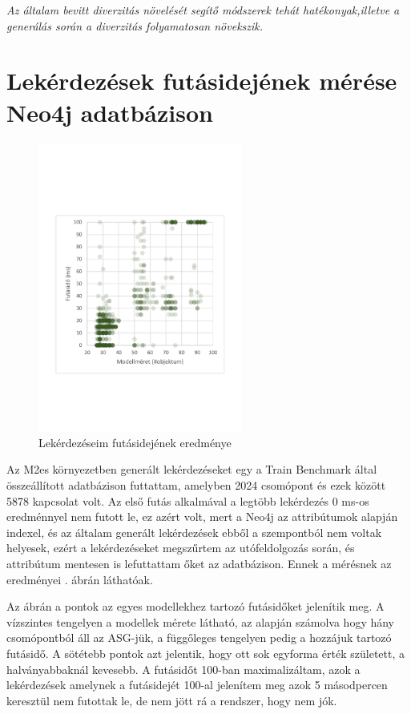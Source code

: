 \textit{Az általam bevitt diverzitás növelését segítő módszerek tehát hatékonyak,illetve a generálás során a diverzitás folyamatosan növekszik.}

\section{Lekérdezések futásidejének mérése Neo4j adatbázison}

\begin{figure}
	\centering
	\includegraphics[width=0.6\textwidth]{figures/measurementRuntimeResultNeo4J}
	\caption{Lekérdezéseim futásidejének eredménye}
	\label{fig:Neo4jRuntime}
\end{figure}

Az M2es környezetben generált lekérdezéseket egy a Train Benchmark által összeállított adatbázison futtattam, amelyben 2024 csomópont és ezek között 5878 kapcsolat volt. Az első futás alkalmával a legtöbb lekérdezés 0 ms-os eredménnyel nem futott le, ez azért volt, mert a Neo4j az attribútumok alapján indexel, és az általam generált lekérdezések ebből a szempontból nem voltak helyesek, ezért a lekérdezéseket megszűrtem az utófeldolgozás során, és attribútum mentesen is lefuttattam őket az adatbázison. Ennek a mérésnek az eredményei . ábrán láthatóak.   

Az ábrán a pontok az egyes modellekhez tartozó futásidőket jelenítik meg. A vízszintes tengelyen a modellek mérete látható, az alapján számolva hogy hány csomópontból áll az ASG-jük, a függőleges tengelyen pedig a hozzájuk tartozó futásidő. A sötétebb pontok azt jelentik, hogy ott sok egyforma érték született, a halványabbaknál kevesebb. A futásidőt 100-ban maximalizáltam, azok a lekérdezések amelynek a futásidejét 100-al jelenítem meg azok 5 másodpercen keresztül nem futottak le, de nem jött rá a rendszer, hogy nem jók. 

